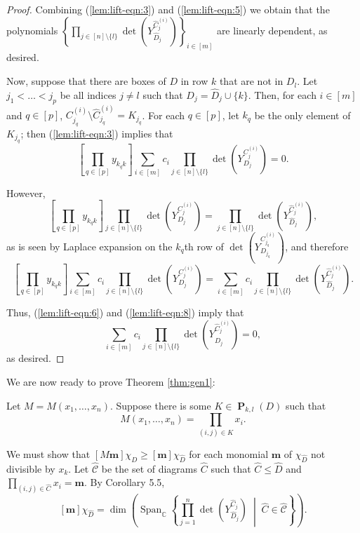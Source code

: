 \documentclass{amsart}
\theoremstyle{definition}
\theoremstyle{named}
\newcommand*{\C}{\mathbb{C}}
\DeclareMathOperator*{\Span}{Span}
\DeclareMathOperator*{\Purple}{\mathbf{P}}
\begin{document}
\begin{proof}
Combining (\ref{lem:lift-eqn:3}) and (\ref{lem:lift-eqn:5}) we obtain that the polynomials $\left\{ \prod_{j \in [n] \setminus \{l\}} \det(Y^{\widehat{C}^{(i)}_j}_{\widehat{D}_j}) \right\}_{i \in [m]}$ are linearly dependent, as desired.

Now, suppose that there are boxes of $D$ in row $k$ that are not in $D_l$. Let $j_1 < \dots < j_p$ be all indices $j \ne l$ such that $D_j = \widehat{D}_j \cup \{k\}$. Then, for each $i \in [m]$ and $q \in [p]$, $C^{(i)}_{j_q} \setminus \widehat{C}^{(i)}_{j_q} = K_{j_q}$. For each $q \in [p]$, let $k_q$ be the only element of $K_{j_q}$; then (\ref{lem:lift-eqn:3}) implies that
\begin{equation} \label{lem:lift-eqn:6}
\left[ \prod_{q \in [p]} y_{k_q k} \right] \sum_{i \in [m]} c_i \prod_{j \in [n] \setminus \{l\}} \det(Y^{C^{(i)}_j}_{D_j}) = 0.
\end{equation}

However,
\begin{equation}
\left[ \prod_{q \in [p]} y_{k_q k} \right] \prod_{j \in [n] \setminus \{l\}} \det(Y^{C^{(i)}_j}_{D_j}) = \prod_{j \in [n] \setminus \{l\}} \det(Y^{\widehat{C}^{(i)}_j}_{\widehat{D}_j}),
\end{equation}
as is seen by Laplace expansion on the $k_q$th row of $\det(Y^{C^{(i)}_{j_q}}_{D_{j_q}})$, and therefore
\begin{equation} \label{lem:lift-eqn:8}
\left[ \prod_{q \in [p]} y_{k_q k} \right] \sum_{i \in [m]} c_i \prod_{j \in [n] \setminus \{l\}} \det(Y^{C^{(i)}_j}_{D_j}) = \sum_{i \in [m]} c_i \prod_{j \in [n] \setminus \{l\}} \det(Y^{\widehat{C}^{(i)}_j}_{\widehat{D}_j}).
\end{equation}

Thus, (\ref{lem:lift-eqn:6}) and (\ref{lem:lift-eqn:8}) imply that
\begin{equation}
\sum_{i \in [m]} c_i \prod_{j \in [n] \setminus \{l\}} \det(Y^{\widehat{C}^{(i)}_j}_{\widehat{D}_j}) = 0,
\end{equation}
as desired.
\end{proof}

We are now ready to prove Theorem \ref{thm:gen1}:
\bigskip

 Let $M = M(x_1, \dots, x_n)$.
Suppose there is some $K \in \Purple_{k, l}(D)$ such that
\[
M(x_1, \dots, x_n) = \prod_{(i, j) \in K} x_i.
\]

We must show that $[M\mathbf{m}] \chi_D \ge [\mathbf{m}] \chi_{\widehat{D}}$ for each monomial $\mathbf{m}$ of $\chi_{\widehat{D}}$ not divisible by $x_k$. Let $\widehat{\mathcal{C}}$ be the set of diagrams $\widehat{C}$ such that $\widehat{C} \le \widehat{D}$ and $\prod_{(i, j) \in \widehat{C}} x_i = \mathbf{m}$. By Corollary 5.5,
\[
[\mathbf{m}]\chi_{\widehat{D}} = \dim \left( \textstyle \Span_\C \displaystyle \left\{ \prod_{j=1}^n \det(Y^{\widehat{C}_j}_{\widehat{D}_j}) \;\middle|\; \widehat{C} \in \widehat{\mathcal{C}} \right\} \right).
\]
\end{document}
